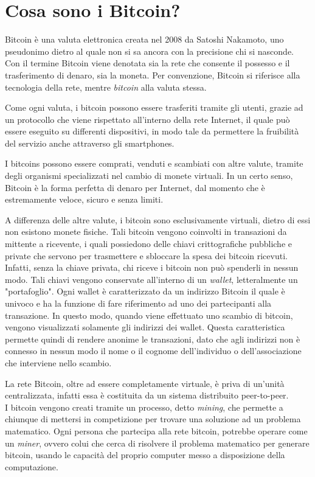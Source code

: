 \section{Cosa sono i Bitcoin?}

Bitcoin è una valuta elettronica creata nel 2008 da Satoshi Nakamoto, uno pseudonimo dietro al quale non si sa ancora con la precisione chi si nasconde.
Con il termine Bitcoin viene denotata sia la rete che consente il possesso e il trasferimento di denaro, sia la moneta. Per convenzione, Bitcoin si riferisce alla tecnologia della rete, mentre \textit{bitcoin} alla valuta stessa.

Come ogni valuta, i bitcoin possono essere trasferiti tramite gli utenti, grazie ad un protocollo che viene rispettato all'interno della rete Internet, il quale può essere eseguito su differenti dispositivi, in modo tale da permettere la fruibilità del servizio anche attraverso gli smartphones.
 
I bitcoins possono essere comprati, venduti e scambiati con altre valute, tramite degli organismi specializzati nel cambio di monete virtuali. In un certo senso, Bitcoin è la forma perfetta di denaro per Internet, dal momento che è estremamente veloce, sicuro e senza limiti.

A differenza delle altre valute, i bitcoin sono esclusivamente virtuali, dietro di essi non esistono monete fisiche. Tali bitcoin vengono coinvolti in transazioni da mittente a ricevente, i quali possiedono delle chiavi crittografiche pubbliche e private che servono per trasmettere e sbloccare la spesa dei bitcoin ricevuti.
Infatti, senza la chiave privata, chi riceve i bitcoin non può spenderli in nessun modo. Tali chiavi vengono conservate all'interno di un \textit{wallet}, letteralmente un "portafoglio". Ogni wallet è caratterizzato da un indirizzo Bitcoin il quale è univoco e ha la funzione di fare riferimento ad uno dei partecipanti alla transazione. In questo modo, quando viene effettuato uno scambio di bitcoin, vengono visualizzati solamente gli indirizzi dei wallet. Questa caratteristica permette quindi di rendere anonime le transazioni, dato che agli indirizzi non è connesso in nessun modo il nome o il cognome dell'individuo o dell'associazione che interviene nello scambio.

La rete Bitcoin, oltre ad essere completamente virtuale, è priva di un'unità centralizzata, infatti essa è costituita da un sistema distribuito peer-to-peer.\\
I bitcoin vengono creati tramite un processo, detto \textit{mining}, che permette a chiunque di mettersi in competizione per trovare una soluzione ad un problema matematico. Ogni persona che partecipa alla rete bitcoin, potrebbe operare come un \textit{miner}, ovvero colui che cerca di risolvere il problema matematico per generare bitcoin, usando le capacità del proprio computer messo a disposizione della computazione.\\

